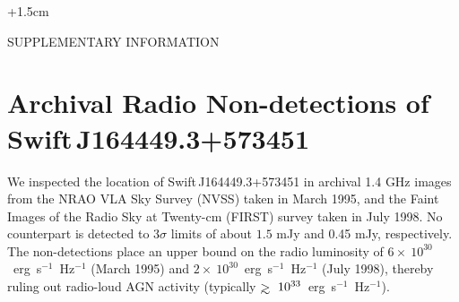 
\textwidth16.15cm\hoffset+1.5cm

\def\simlt{\mathrel{\hbox{\rlap{\hbox{\lower4pt\hbox{$\sim$}}}\hbox{$<$}}}}
\def\simgt{\mathrel{\hbox{\rlap{\hbox{\lower4pt\hbox{$\sim$}}}\hbox{$>$}}}}

\def\ale{\mathrel{\hbox{\rlap{\hbox{\lower4pt\hbox{$\sim$}}}\hbox{$<$}}}}
\def\age{\mathrel{\hbox{\rlap{\hbox{\lower4pt\hbox{$\sim$}}}\hbox{$>$}}}}

\def\nodata{---}

\def\ra#1#2#3{#1$^{\rm h}$#2$^{\rm m}$#3$^{\rm s}$}
\def\dec#1#2#3{$#1^\circ#2'#3''$}

\newcommand{\hst}{\textit{HST}}
\newcommand{\swift}{\textit{Swift}}
\newcommand{\ergcms}{erg cm$^{-2}$ s$^{-1}$}
\newcommand{\uJy}{\mbox{$\mu$Jy}}
\newcommand{\Tburst}{\mbox{$T_{\rm GRB}$}}

\def\spose#1{\hbox to 0pt{#1\hss}}



\begin{center}
{\Large SUPPLEMENTARY INFORMATION} \\
\end{center}



\section{Archival Radio Non-detections of Swift\,J164449.3+573451}

We inspected the location of Swift\,J164449.3+573451 in archival 1.4
GHz images from the NRAO VLA Sky Survey (NVSS) taken in March 1995,
and the Faint Images of the Radio Sky at Twenty-cm (FIRST) survey
taken in July 1998.  No counterpart is detected to $3\sigma$ limits of
about $1.5$ mJy and 0.45 mJy, respectively.  The non-detections place
an upper bound on the radio luminosity of 
$6\times~10^{30}$~erg~s$^{-1}$~Hz$^{-1}$ (March 1995) and 
$2\times~10^{30}$~erg~s$^{-1}$~Hz$^{-1}$ (July 1998), 
thereby ruling out radio-loud AGN activity
(typically\cite{mpm90} $\simgt~10^{33}$~erg~s$^{-1}$~Hz$^{-1}$).


